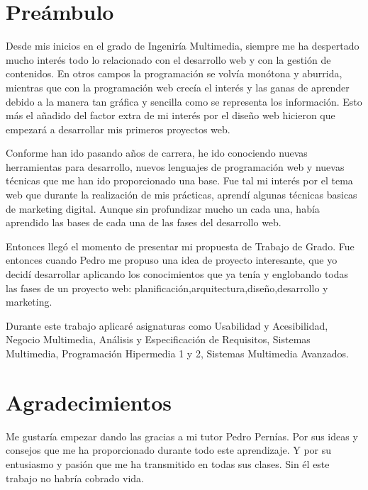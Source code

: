 \chapter*{Preámbulo}

Desde mis inicios en el grado de Ingeniría Multimedia, siempre me ha despertado mucho interés todo lo relacionado con el desarrollo web y
con la gestión de contenidos. En otros campos la programación se volvía monótona y aburrida, mientras que con la programación web crecía el interés y
las ganas de aprender debido a la manera tan gráfica y sencilla como se representa los información. Esto más el añadido del factor extra de mi interés por
el diseño web hicieron que empezará a desarrollar mis primeros proyectos web.

\vspace{5 mm}

Conforme han ido pasando años de carrera, he ido conociendo nuevas herramientas para desarrollo, nuevos lenguajes de programación web y nuevas técnicas que me
han ido proporcionado una base. Fue tal mi interés por el tema web que durante la realización de mis prácticas, aprendí algunas técnicas basicas de
marketing digital. Aunque sin profundizar mucho un cada una, había aprendido las bases de cada una de las fases del desarrollo web.

\vspace{5 mm}

Entonces llegó el momento de presentar mi propuesta de Trabajo de Grado. Fue entonces cuando Pedro me propuso una idea de proyecto interesante, que yo decidí
desarrollar aplicando los conocimientos que ya tenía y englobando todas las fases de un proyecto web: planificación,arquitectura,diseño,desarrollo y marketing.

\vspace{5 mm}

Durante este trabajo aplicaré asignaturas como Usabilidad y Acesibilidad, Negocio Multimedia, Análisis y Especificación de Requisitos, Sistemas Multimedia,
Programación Hipermedia 1 y 2, Sistemas Multimedia Avanzados.




\chapter*{Agradecimientos}

Me gustaría empezar dando las gracias a mi tutor Pedro Pernías. Por sus ideas y consejos que me ha proporcionado durante todo este aprendizaje.
Y por su entusiasmo y pasión que me ha transmitido en todas sus clases. Sin él este trabajo no habría cobrado vida.

